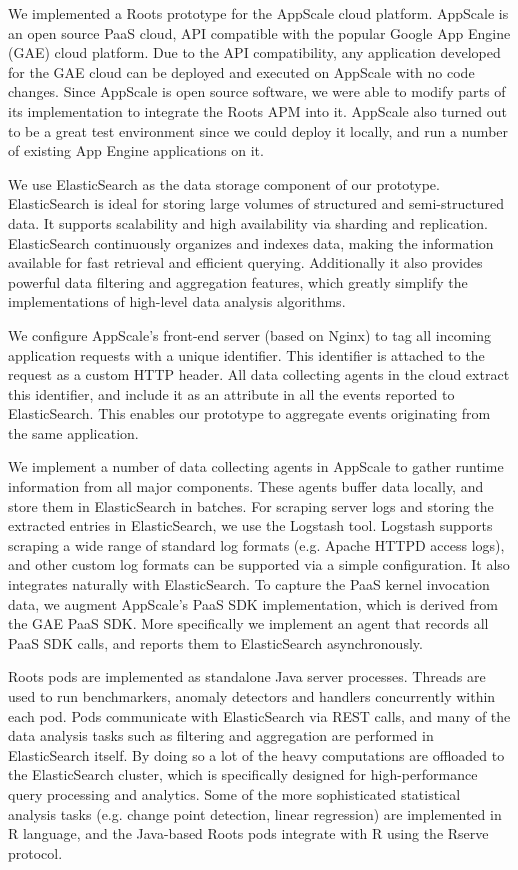 We implemented a Roots prototype for the AppScale cloud platform. AppScale is an open
source PaaS cloud, API compatible with the popular Google App Engine (GAE) cloud platform.
Due to the API compatibility, any application developed for the GAE cloud can be deployed
and executed on AppScale with no code changes. Since AppScale is open source software, we
were able to modify parts of its implementation to integrate the Roots APM into it. AppScale also
turned out to be a great test environment since we could deploy it locally, and run a number of
existing App Engine applications on it.

We use ElasticSearch as the data storage component of our prototype. ElasticSearch is ideal 
for storing large volumes of structured and semi-structured data. It supports scalability and 
high availability via sharding and replication.
ElasticSearch continuously organizes and indexes data, making the information available 
for fast retrieval and efficient querying. Additionally it also provides
powerful data filtering and aggregation features, which greatly simplify the implementations of high-level
data analysis algorithms.

We configure AppScale's front-end server (based on Nginx) to tag all incoming application requests
with a unique identifier. This identifier is attached to the request as a custom HTTP header.
All data collecting agents in the cloud extract this identifier, and include it as an attribute
in all the events reported to ElasticSearch. This enables our prototype to aggregate events originating
from the same application.

We implement a number of data collecting agents in AppScale to gather runtime information
from all major components. These agents buffer data locally, and store them in ElasticSearch
in batches. For scraping server logs and storing the extracted entries in ElasticSearch,
we use the Logstash tool. Logstash supports scraping a wide range of standard log formats (e.g. 
Apache HTTPD access logs), and other custom log formats can be supported via a simple configuration.
It also integrates naturally with ElasticSearch.
To capture the PaaS kernel invocation data, we augment AppScale's PaaS SDK implementation,
which is derived from the GAE PaaS SDK. More specifically we implement an agent that records
all PaaS SDK calls, and reports them to ElasticSearch asynchronously. 

Roots pods are implemented as standalone Java server processes. Threads are used to run benchmarkers,
anomaly detectors and handlers concurrently within each pod. Pods communicate with ElasticSearch via
REST calls, and many of the data analysis tasks such as filtering and aggregation are performed
in ElasticSearch itself. By doing so a lot of the heavy computations are offloaded to the 
ElasticSearch cluster, which is specifically designed for high-performance query processing
and analytics. Some of the more sophisticated statistical analysis tasks (e.g. change point detection, 
linear regression) are implemented in R language,
and the Java-based Roots pods integrate with R using the Rserve protocol.


